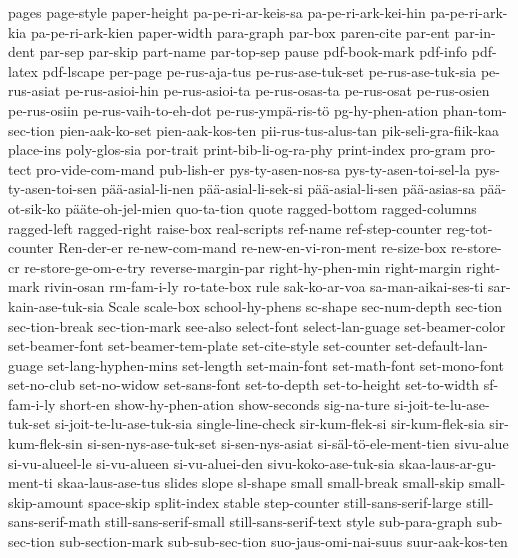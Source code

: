 {  pages
  page-style
  paper-height
  pa-pe-ri-ar-keis-sa
  pa-pe-ri-ark-kei-hin
  pa-pe-ri-ark-kia
  pa-pe-ri-ark-kien
  paper-width
  para-graph
  par-box
  paren-cite
  par-ent
  par-in-dent
  par-sep
  par-skip
  part-name
  par-top-sep
  pause
  pdf-book-mark
  pdf-info
  pdf-latex
  pdf-lscape
  per-page
  pe-rus-aja-tus
  pe-rus-ase-tuk-set
  pe-rus-ase-tuk-sia
  pe-rus-asiat
  pe-rus-asioi-hin
  pe-rus-asioi-ta
  pe-rus-osas-ta
  pe-rus-osat
  pe-rus-osien
  pe-rus-osiin
  pe-rus-vaih-to-eh-dot
  pe-rus-ympä-ris-tö
  pg-hy-phen-ation
  phan-tom-sec-tion
  pien-aak-ko-set
  pien-aak-kos-ten
  pii-rus-tus-alus-tan
  pik-seli-gra-fiik-kaa
  place-ins
  poly-glos-sia
  por-trait
  print-bib-li-og-ra-phy
  print-index
  pro-gram
  pro-tect
  pro-vide-com-mand
  pub-lish-er
  pys-ty-asen-nos-sa
  pys-ty-asen-toi-sel-la
  pys-ty-asen-toi-sen
  pää-asial-li-nen
  pää-asial-li-sek-si
  pää-asial-li-sen
  pää-asias-sa
  pää-ot-sik-ko
  pääte-oh-jel-mien
  quo-ta-tion
  quote
  ragged-bottom
  ragged-columns
  ragged-left
  ragged-right
  raise-box
  real-scripts
  ref-name
  ref-step-counter
  reg-tot-counter
  Ren-der-er
  re-new-com-mand
  re-new-en-vi-ron-ment
  re-size-box
  re-store-cr
  re-store-ge-om-e-try
  reverse-margin-par
  right-hy-phen-min
  right-margin
  right-mark
  rivin-osan
  rm-fam-i-ly
  ro-tate-box
  rule
  sak-ko-ar-voa
  sa-man-aikai-ses-ti
  sar-kain-ase-tuk-sia
  Scale
  scale-box
  school-hy-phens
  sc-shape
  sec-num-depth
  sec-tion
  sec-tion-break
  sec-tion-mark
  see-also
  select-font
  select-lan-guage
  set-beamer-color
  set-beamer-font
  set-beamer-tem-plate
  set-cite-style
  set-counter
  set-default-lan-guage
  set-lang-hyphen-mins
  set-length
  set-main-font
  set-math-font
  set-mono-font
  set-no-club
  set-no-widow
  set-sans-font
  set-to-depth
  set-to-height
  set-to-width
  sf-fam-i-ly
  short-en
  show-hy-phen-ation
  show-seconds
  sig-na-ture
  si-joit-te-lu-ase-tuk-set
  si-joit-te-lu-ase-tuk-sia
  single-line-check
  sir-kum-flek-si
  sir-kum-flek-sia
  sir-kum-flek-sin
  si-sen-nys-ase-tuk-set
  si-sen-nys-asiat
  si-säl-tö-ele-ment-tien
  sivu-alue
  si-vu-alueel-le
  si-vu-alueen
  si-vu-aluei-den
  sivu-koko-ase-tuk-sia
  skaa-laus-ar-gu-ment-ti
  skaa-laus-ase-tus
  slides
  slope
  sl-shape
  small
  small-break
  small-skip
  small-skip-amount
  space-skip
  split-index
  stable
  step-counter
  still-sans-serif-large
  still-sans-serif-math
  still-sans-serif-small
  still-sans-serif-text
  style
  sub-para-graph
  sub-sec-tion
  sub-section-mark
  sub-sub-sec-tion
  suo-jaus-omi-nai-suus
  suur-aak-kos-ten
}
